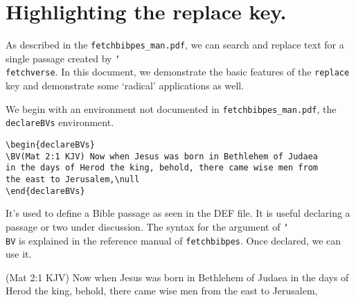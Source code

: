 \documentclass{article}
\providecommand\cs[1]{\texttt{\char`\\#1}}
\let\pkg\texttt
\begin{document}
\section{Highlighting the replace key.}

As described in the \texttt{fetchbibpes\_man.pdf}, we can search and replace
text for a single passage created by \cs{fetchverse}. In this document, we
demonstrate the basic features of the \texttt{replace} key and demonstrate
some `radical' applications as well.

We begin with an environment not documented in \texttt{fetchbibpes\_man.pdf},
the \texttt{declareBVs} environment.
\begin{verbatim}
\begin{declareBVs}
\BV(Mat 2:1 KJV) Now when Jesus was born in Bethlehem of Judaea
in the days of Herod the king, behold, there came wise men from
the east to Jerusalem,\null
\end{declareBVs}
\end{verbatim}
It's used to define a Bible passage as seen in the DEF file. It is useful
declaring a passage or two under discussion. The syntax for the argument of
\cs{BV} is explained in the reference manual of \pkg{fetchbibpes}. Once
declared, we can use it.
\begin{declareBVs}
\BV(Mat 2:1 KJV) Now when Jesus was born in Bethlehem of Judaea in the days
of Herod the king, behold, there came wise men from the east to Jerusalem,\null
\end{declareBVs}
\end{document}
